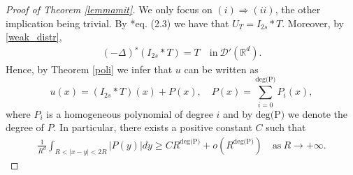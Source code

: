 \documentclass[letterpaper, 11pt,  reqno]{amsart}
\theoremstyle{definition}
\theoremstyle{remark}
\numberwithin{equation}{section}
\newcommand{\R}{{\mathbb R}}
\begin{document}
\begin{proof}[Proof of Theorem \ref{lemmamit}]
\noindent We only focus on $(i)\Rightarrow (ii)$, the other implication being trivial. By \cite{mazya}*{eq. (2.3)}  we have that $U_T=I_{2s}*T$. Moreover, by \eqref{weak_distr}, 
 \begin{align}\label{rz_solve}
 (-\Delta)^{s}(I_{2s}*T)=T\quad \text{in}\ \mathscr{D}'(\R^d).
 \end{align}
Hence, by Theorem \ref{poli} we infer that $u$  can be written as
 \begin{equation*}
 u(x)=(I_{2s}*T)(x)+P(x),\quad P(x)=\sum_{i=0}^{\text{deg(P)}}P_i(x),
 \end{equation*}
 where $P_i$ is a homogeneous polynomial of degree $i$ and by $\text{deg(P)}$ we denote the degree of $P$. 
In particular,  there exists a positive constant $C$ such that
\begin{equation}\label{low_poli}
\begin{split}
\frac{1}{R^d}\int_{R<|x-y|<2R} |P(y)|dy
 \ge CR^{\text{deg(P)}} +o(R^{\text{deg(P)}})\quad \text{as}\ R\to +\infty.
\end{split}
\end{equation}


\end{proof}
\end{document}
